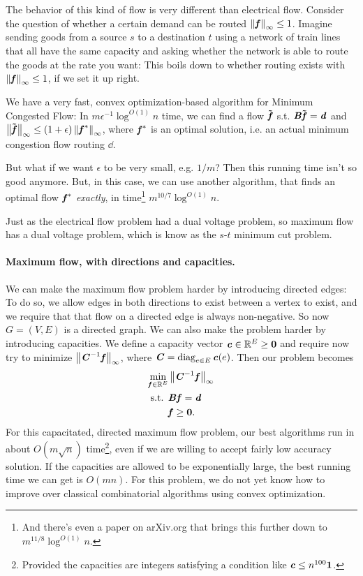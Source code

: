 The behavior of this kind of flow is very different than electrical
flow. Consider the question of whether a certain demand can be routed
$\left\| \boldsymbol{\mathit{f}} \right\|_{\infty} \leq 1$.
Imagine sending goods from a source $s$ to a destination $t$ using a
network of train lines that all have the
same capacity and asking whether the network is able to route the
goods at the rate you want: This boils down to whether routing exists
with $\left\| \boldsymbol{\mathit{f}} \right\|_{\infty} \leq 1$, if we set it up right.

We have a very fast, convex optimization-based algorithm for Minimum Congested Flow:
In $m \epsilon^{-1} \log^{O(1)} n$ time, we can find a flow $\boldsymbol{\tilde{\mathit{f}}}$
s.t. $\boldsymbol{\mathit{B}} \boldsymbol{\tilde{\mathit{f}}} = \boldsymbol{\mathit{d}}$ and $\left\| \boldsymbol{\tilde{\mathit{f}}} \right\|_{\infty} \leq
(1+\epsilon)\left\| \boldsymbol{\mathit{f}}^* \right\|_{\infty}$, where $\boldsymbol{\mathit{f}}^*$ is an optimal solution, i.e. an
actual minimum congestion flow routing $\dd$.

But what if we want $\epsilon$ to be very small, e.g. $1/m$? Then this running
time isn't so good anymore.
But, in this case, we can use another algorithm, that finds an optimal
flow $\boldsymbol{\mathit{f}}^*$ \emph{exactly}, in time\footnote{And there's even a paper on arXiv.org that brings this further
  down to $m^{11/8} \log^{O(1)} n$.} $m^{10/7} \log^{O(1)} n $.

Just as the electrical flow problem had a dual voltage problem, so
maximum flow has a dual voltage problem, which is know as the
$s$-$t$ minimum cut problem.

\paragraph{Maximum flow, with directions and capacities.}
We can make the maximum flow problem harder by introducing directed
edges: To do so, we allow edges in both directions to exist between a
vertex to exist, and we require that that flow on a directed edge is
always non-negative. So now $G=(V,E)$ is a directed graph.
We can also make the problem harder by introducing capacities.
We define a capacity vector $\boldsymbol{\mathit{c}} \in \mathbb{R}^E \geq \boldsymbol{0}$ and require
now try to minimize $\left\| \boldsymbol{\mathit{C}}^{-1} \boldsymbol{\mathit{f}} \right\|_{\infty}$, where $\boldsymbol{\mathit{C}} =
\operatorname*{diag}_{e \in E}\boldsymbol{\mathit{c}}(e)$.
Then our problem becomes
\begin{align*}
\min_{\boldsymbol{\mathit{f}} \in \mathbb{R}^E } & \left\| \boldsymbol{\mathit{C}}^{-1} \boldsymbol{\mathit{f}} \right\|_{\infty} \\
  \textrm{s.t. } &  \boldsymbol{\mathit{B}} \boldsymbol{\mathit{f}} = \boldsymbol{\mathit{d}}\\
                     &  \boldsymbol{\mathit{f}} \geq \boldsymbol{0}.
\end{align*}
For this capacitated, directed maximum flow problem, our best
algorithms run in about $O( m \sqrt{n} )$ time\footnote{Provided the
  capacities are integers satisfying a condition like $\boldsymbol{\mathit{c}} \leq n^{100} \boldsymbol{1}$.}, even if we are willing to
accept fairly low accuracy solution.
If the capacities are allowed to be exponentially large, the best
running time we can get is $O(m n)$.
For this problem, we do not yet know how to improve over classical
combinatorial algorithms using convex optimization.

